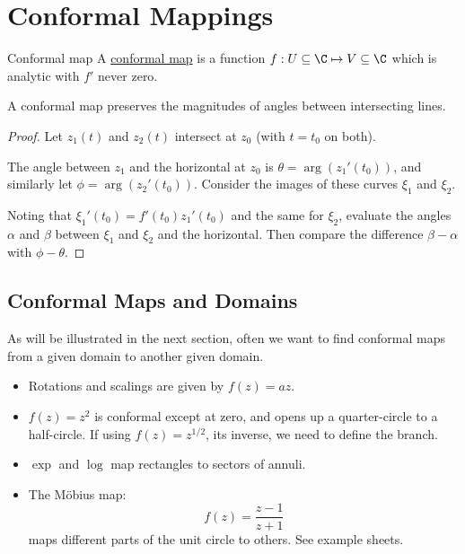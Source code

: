 \documentclass[../Main.tex]{subfiles}
\begin{document}
\section{Conformal Mappings}
\begin{definition}{Conformal map}
    A \underline{conformal map} is a function $f : U \subseteq \C \mapsto V \subseteq \C$ which is analytic with $f'$ never zero.
\end{definition}
\begin{proposition}
    A conformal map preserves the magnitudes of angles between intersecting lines.
    \label{propConfMapAngles}
\end{proposition}
\begin{proof}
    Let $z_1(t)$ and $z_2(t)$ intersect at $z_0$ (with $t = t_0$ on both).

    The angle between $z_1$ and the horizontal at $z_0$ is $\theta = \arg(z_1'(t_0))$, and similarly let $\phi = \arg(z_2'(t_0))$. Consider the images of these curves $\xi_1$ and $\xi_2$.

    Noting that $\xi_1'(t_0) = f'(t_0) z_1'(t_0)$ and the same for $\xi_2$, evaluate the angles $\alpha$ and $\beta$ between $\xi_1$ and $\xi_2$ and the horizontal. Then compare the difference $\beta - \alpha$ with $\phi - \theta$.
\end{proof}
\subsection{Conformal Maps and Domains}
As will be illustrated in the next section, often we want to find conformal maps from a given domain to another given domain.
\begin{itemize}
    \item Rotations and scalings are given by $f(z) = az$.
    \item $f(z) = z^2$ is conformal except at zero, and opens up a quarter-circle to a half-circle. If using $f(z) = z^{1 / 2}$, its inverse, we need to define the branch.
    \item $\exp$ and $\log$ map rectangles to sectors of annuli.
    \item The M\"obius map:
        \begin{equation*}
            f(z) = \frac{z - 1}{z + 1}
        \end{equation*}
        maps different parts of the unit circle to others. See example sheets.
\end{itemize}
\end{document}

